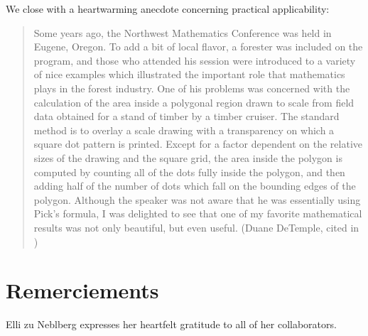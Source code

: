 \documentclass[a4paper]{amsart}
\numberwithin{equation}{section}
\theoremstyle{plain}
\theoremstyle{definition}
\begin{document}
We close with a heartwarming anecdote concerning practical applicability: 

\begin{quote}
  Some years ago, the Northwest Mathematics Conference was held in Eugene,
  Oregon. To add a bit of local flavor, a forester was included on the program,
  and those who attended his session were introduced to a variety of nice
  examples which illustrated the important role that mathematics plays in the
  forest industry. One of his problems was concerned with the calculation of
  the area inside a polygonal region drawn to scale from field data obtained for
  a stand of timber by a timber cruiser. The standard method is to overlay a
  scale drawing with a transparency on which a square dot pattern is printed.
  Except for a factor dependent on the relative sizes of the drawing and the
  square grid, the area inside the polygon is computed by counting all of the
  dots fully inside the polygon, and then adding half of the number of dots
  which fall on the bounding edges of the polygon. Although the speaker was
  not aware that he was essentially using Pick's formula, I was delighted to see
  that one of my favorite mathematical results was not only beautiful, but even
  useful. (Duane DeTemple, cited in \cite{Gruenbaum:Shepard:1993})
\end{quote}


\section*{Remerciements}

Elli zu Neblberg expresses her heartfelt gratitude to all of her collaborators.

\end{document}
